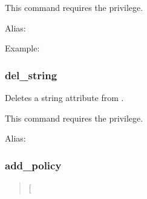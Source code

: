 \documentclass[letterpaper,10pt,english]{sphinxmanual}
\begin{document}
\sphinxAtStartPar
This command requires the  privilege.

\sphinxAtStartPar
Alias: 

\sphinxAtStartPar
Example:

\begin{sphinxVerbatim}[commandchars=\\\{\}]
   
   \PYG{l+s+s2}{[}\PYG{l+s+s2}{\PYGZcb{}]}
\end{sphinxVerbatim}


\subsubsection{del\_string}
\label{\detokenize{admin/admin_commands/kadmin_local:del-string}}\label{\detokenize{admin/admin_commands/kadmin_local:id12}}\begin{quote}

\sphinxAtStartPar
{}  
\end{quote}

\sphinxAtStartPar
Deletes a string attribute from .

\sphinxAtStartPar
This command requires the  privilege.

\sphinxAtStartPar
Alias: 


\subsubsection{add\_policy}
\label{\detokenize{admin/admin_commands/kadmin_local:add-policy}}\label{\detokenize{admin/admin_commands/kadmin_local:id13}}\begin{quote}

\sphinxAtStartPar
{} {[}\sphinxstyleemphasis{options}{]} 
\end{quote}
\end{document}
